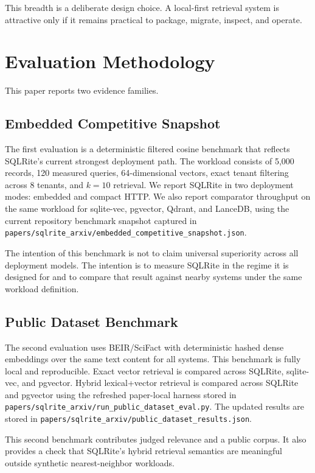 \documentclass[11pt]{article}
\begin{document}
This breadth is a deliberate design choice. A local-first retrieval system is attractive only if it remains practical to package, migrate, inspect, and operate.

\section{Evaluation Methodology}
This paper reports two evidence families.

\subsection{Embedded Competitive Snapshot}
The first evaluation is a deterministic filtered cosine benchmark that reflects SQLRite's current strongest deployment path. The workload consists of 5,000 records, 120 measured queries, 64-dimensional vectors, exact tenant filtering across 8 tenants, and \(k=10\) retrieval. We report SQLRite in two deployment modes: embedded and compact HTTP. We also report comparator throughput on the same workload for sqlite-vec, pgvector, Qdrant, and LanceDB, using the current repository benchmark snapshot captured in \texttt{papers/sqlrite\_arxiv/embedded\_competitive\_snapshot.json}.

The intention of this benchmark is not to claim universal superiority across all deployment models. The intention is to measure SQLRite in the regime it is designed for and to compare that result against nearby systems under the same workload definition.

\subsection{Public Dataset Benchmark}
The second evaluation uses BEIR/SciFact with deterministic hashed dense embeddings over the same text content for all systems. This benchmark is fully local and reproducible. Exact vector retrieval is compared across SQLRite, sqlite-vec, and pgvector. Hybrid lexical+vector retrieval is compared across SQLRite and pgvector using the refreshed paper-local harness stored in \texttt{papers/sqlrite\_arxiv/run\_public\_dataset\_eval.py}. The updated results are stored in \texttt{papers/sqlrite\_arxiv/public\_dataset\_results.json}.

This second benchmark contributes judged relevance and a public corpus. It also provides a check that SQLRite's hybrid retrieval semantics are meaningful outside synthetic nearest-neighbor workloads.
\end{document}
